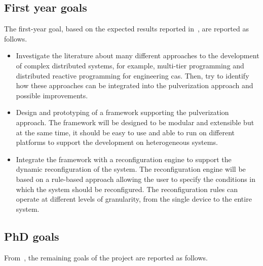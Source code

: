 \documentclass[12pt]{article}
\begin{document}
\subsection{First year goals}\label{subsec:first-year-activities}

The first-year goal,
based on the expected results reported in~,
are reported as follows.

\begin{itemize}
	\item Investigate the literature about many different approaches to the development of complex distributed systems,
	      for example, multi-tier programming and distributed reactive programming for engineering \ac{cas}.
	      Then, try to identify how these approaches can be integrated into the pulverization approach and possible improvements.
	\item Design and prototyping of a framework supporting the pulverization approach.
	      The framework will be designed to be modular and extensible but at the same time,
	      it should be easy to use and able to run on different platforms to support the development on heterogeneous systems.
	\item Integrate the framework with a reconfiguration engine to support the dynamic reconfiguration of the system.
	      The reconfiguration engine will be based on a rule-based approach allowing the user to specify the conditions in which the system should be reconfigured.
	      The reconfiguration rules can operate at different levels of granularity,
	      from the single device to the entire system.
\end{itemize}

\subsection{PhD goals}\label{subsec:phd-activities}

From~,
the remaining goals of the project are reported as follows.
\end{document}

